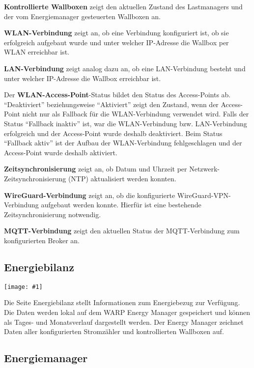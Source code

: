 \documentclass[a4paper,10pt]{article}
\newcommand{\gfx}[1]{\texttt{[image: \#1]}}
\begin{document}
\begin{multicols*}{2}
	\textbf{Kontrollierte Wallboxen} zeigt den aktuellen Zustand des Lastmanagers und der vom Energiemanager gesteuerten
	Wallboxen an.

	\textbf{WLAN-Verbindung} zeigt an, ob eine Verbindung konfiguriert ist, ob sie erfolgreich aufgebaut wurde und
	unter welcher IP-Adresse die Wallbox per WLAN erreichbar ist.

	\textbf{LAN-Verbindung} zeigt analog dazu an, ob eine LAN-Verbindung besteht und unter welcher IP-Adresse die Wallbox erreichbar ist.

	Der \textbf{WLAN-Access-Point}-Status bildet den Status des Access-Points ab.
	\enquote{Deaktiviert} beziehungsweise \enquote{Aktiviert} zeigt den Zustand, wenn der Access-Point nicht
	nur als Fallback für die WLAN-Verbindung verwendet wird. Falls der Status \enquote{Fallback inaktiv} ist,
	war die WLAN-Verbindung bzw. LAN-Verbindung erfolgreich und der Access-Point wurde deshalb deaktiviert.
	Beim Status \enquote{Fallback aktiv} ist der Aufbau der WLAN-Verbindung fehlgeschlagen und der
	Access-Point wurde deshalb aktiviert.

	\textbf{Zeitsynchronisierung} zeigt an, ob Datum und Uhrzeit per Netzwerk-Zeitsynchronisierung (NTP) aktualisiert werden konnten.

	\textbf{WireGuard-Verbindung} zeigt an, ob die konfigurierte WireGuard-VPN-Verbindung aufgebaut werden konnte. Hierfür ist eine bestehende Zeitsynchronisierung notwendig.

	\textbf{MQTT-Verbindung} zeigt den aktuellen Status der MQTT-Verbindung
	zum konfigurierten Broker an.

	\subsection{Energiebilanz}

	\gfx{./img/resized/web_em_energy_analysis}
	\vspace{-0.2cm}

	Die Seite Energiebilanz stellt Informationen zum Energiebezug zur Verfügung.
	Die Daten werden lokal auf dem WARP Energy Manager gespeichert und
	können als Tages- und Monatsverlauf dargestellt werden.
	Der Energy Manager zeichnet Daten aller konfigurierten Stromzähler und kontrollierten Wallboxen auf.

	\vspace{-0.3cm}
	\subsection{Energiemanager}

\end{multicols*}
\end{document}
